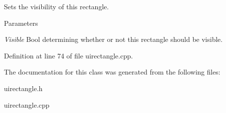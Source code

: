 Sets the visibility of this rectangle. 


\begin{DoxyParams}{Parameters}
\item[{\em Visible}]Bool determining whether or not this rectangle should be visible. \end{DoxyParams}


Definition at line 74 of file uirectangle.cpp.



The documentation for this class was generated from the following files:\begin{DoxyCompactItemize}
\item 
uirectangle.h\item 
uirectangle.cpp\end{DoxyCompactItemize}

